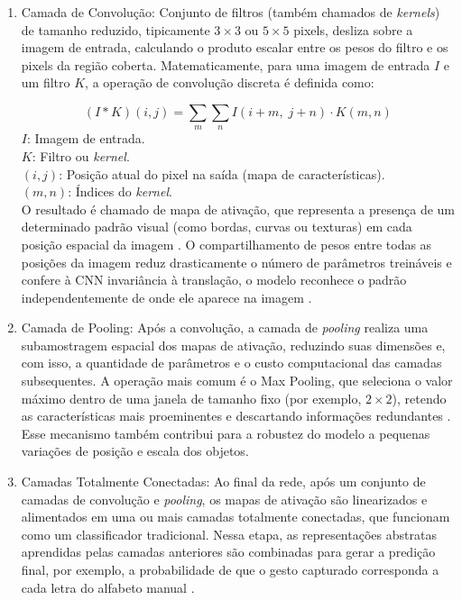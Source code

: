 \documentclass[
    12pt,                %
    openright,           %
    oneside,             %
    a4paper,             %
    english,             %
    brazil               %
]{abntex2}
\begin{document}
\begin{enumerate}

  \item Camada de Convolução: Conjunto de filtros (também chamados de \textit{kernels}) de tamanho reduzido, tipicamente $3 \times 3$ ou $5 \times 5$ pixels, desliza sobre a imagem de entrada, calculando o produto escalar entre os pesos do filtro e os pixels da região coberta. Matematicamente, para uma imagem de entrada $I$ e um filtro $K$, a operação de convolução discreta é definida como:

  \begin{equation}
      (I * K)(i, j) = \sum_{m}\sum_{n} I(i+m,\; j+n) \cdot K(m, n)
  \end{equation}
  $I$: Imagem de entrada. \\
  $K$: Filtro ou \textit{kernel}. \\
  $(i, j)$: Posição atual do pixel na saída (mapa de características). \\
  $(m, n)$: Índices do \textit{kernel}. \\

  O resultado é chamado de mapa de ativação, que representa a presença de um determinado padrão visual (como bordas, curvas ou texturas) em cada posição espacial da imagem \cite{Goodfellow2016}. O compartilhamento de pesos entre todas as posições da imagem reduz drasticamente o número de parâmetros treináveis e confere à CNN invariância à translação, o modelo reconhece o padrão independentemente de onde ele aparece na imagem \cite{Fleck2016}.

  \item Camada de Pooling: Após a convolução, a camada de \textit{pooling} realiza uma subamostragem espacial dos mapas de ativação, reduzindo suas dimensões e, com isso, a quantidade de parâmetros e o custo computacional das camadas subsequentes. A operação mais comum é o Max Pooling, que seleciona o valor máximo dentro de uma janela de tamanho fixo (por exemplo, $2 \times 2$), retendo as características mais proeminentes e descartando informações redundantes \cite{Lecun1998}. Esse mecanismo também contribui para a robustez do modelo a pequenas variações de posição e escala dos objetos.

  \item Camadas Totalmente Conectadas: Ao final da rede, após um conjunto de camadas de convolução e \textit{pooling}, os mapas de ativação são linearizados e alimentados em uma ou mais camadas totalmente conectadas, que funcionam como um classificador tradicional. Nessa etapa, as representações abstratas aprendidas pelas camadas anteriores são combinadas para gerar a predição final, por exemplo, a probabilidade de que o gesto capturado corresponda a cada letra do alfabeto manual \cite{Furtado2019}.

\end{enumerate}
\end{document}
